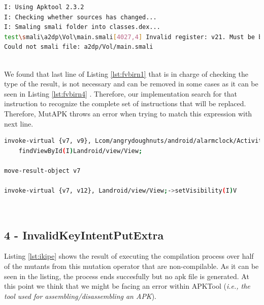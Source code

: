 \begin{minipage}{\textwidth}
	\begin{lstlisting}[language={sh}, label={lst:fvbirn3}, caption={APKTool console response}, numbers=none]
I: Using Apktool 2.3.2
I: Checking whether sources has changed...
I: Smaling smali folder into classes.dex...
test\smali\a2dp\Vol\main.smali[4027,4] Invalid register: v21. Must be between v0 and v15, inclusive.
Could not smali file: a2dp/Vol/main.smali
	\end{lstlisting}
\end{minipage}\\

We found that last line of Listing \ref{lst:fvbirn1} that is in charge of checking the type of the result, is not necessary and can be removed in some cases as it can be seen in Listing \ref{lst:fvbirn4} . Therefore, our implementation search for that instruction to recognize the complete set of instructions that will be replaced. Therefore, MutAPK throws an error when trying to match this expression with next line.

\begin{minipage}{\textwidth}
	\begin{lstlisting}[language={sh}, label={lst:fvbirn4}, caption={APKTool console response}, numbers=none]
invoke-virtual {v7, v9}, Lcom/angrydoughnuts/android/alarmclock/ActivityAlarmNotification;->
	findViewById(I)Landroid/view/View;
	
move-result-object v7
	
invoke-virtual {v7, v12}, Landroid/view/View;->setVisibility(I)V
	\end{lstlisting}
\end{minipage}\\

\subsection{4 - InvalidKeyIntentPutExtra}

Listing \ref{lst:ikipe} shows the result of executing the compilation process over half of the mutants from this mutation operator that are non-compilable. As it can be seen in the listing, the process ends succesfully but no apk file is generated. At this point we think that we might be facing an error within APKTool (\textit{i.e., the tool used for assembling/disassembling an APK}).

